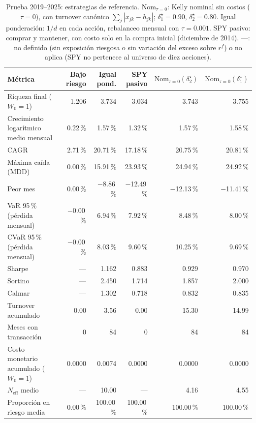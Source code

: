 \begin{table}[h]
\centering
\footnotesize
\setlength{\tabcolsep}{4pt}
\caption{Prueba 2019--2025: estrategias de referencia. $\mathrm{Nom}_{\tau=0}$: Kelly nominal sin costos ($\tau=0$), con turnover canónico $\sum_j|x_{jk}-h_{jk}|$; $\delta_1^\star=0.90$, $\delta_2^\star=0.80$. Igual ponderación: $1/d$ en cada acción, rebalanceo mensual con $\tau=0.001$. SPY pasivo: comprar y mantener, con costo solo en la compra inicial (diciembre de 2014). ---: no definido (sin exposición riesgosa o sin variación del exceso sobre $r^f$) o no aplica (SPY no pertenece al universo de diez acciones).}\label{tab:r2_e}
\begin{tabular}{|l|r|r|r|r|r|}
\hline
\textbf{Métrica} & \textbf{Bajo riesgo} & \textbf{Igual pond.} & \textbf{SPY pasivo} & \textbf{$\mathrm{Nom}_{\tau=0}(\delta_2^\star)$} & \textbf{$\mathrm{Nom}_{\tau=0}(\delta_1^\star)$} \\ \hline
Riqueza final ($W_0=1$) & 1.206 & 3.734 & 3.034 & 3.743 & 3.755 \\ \hline
Crecimiento logarítmico medio mensual & 0.22\,\% & 1.57\,\% & 1.32\,\% & 1.57\,\% & 1.58\,\% \\ \hline
CAGR & 2.71\,\% & 20.71\,\% & 17.18\,\% & 20.75\,\% & 20.81\,\% \\ \hline
Máxima caída (MDD) & 0.00\,\% & 15.91\,\% & 23.93\,\% & 24.94\,\% & 24.92\,\% \\ \hline
Peor mes & 0.00\,\% & $-$8.86\,\% & $-$12.49\,\% & $-$12.13\,\% & $-$11.41\,\% \\ \hline
VaR 95\,\% (pérdida mensual) & $-$0.00\,\% & 6.94\,\% & 7.92\,\% & 8.48\,\% & 8.00\,\% \\ \hline
CVaR 95\,\% (pérdida mensual) & $-$0.00\,\% & 8.03\,\% & 9.60\,\% & 10.25\,\% & 9.69\,\% \\ \hline
Sharpe & --- & 1.162 & 0.883 & 0.929 & 0.970 \\ \hline
Sortino & --- & 2.450 & 1.714 & 1.857 & 2.000 \\ \hline
Calmar & --- & 1.302 & 0.718 & 0.832 & 0.835 \\ \hline
Turnover acumulado & 0.00 & 3.56 & 0.00 & 15.30 & 14.99 \\ \hline
Meses con transacción & 0 & 84 & 0 & 84 & 84 \\ \hline
Costo monetario acumulado ($W_0=1$) & 0.0000 & 0.0074 & 0.0000 & 0.0000 & 0.0000 \\ \hline
$N_{\mathrm{eff}}$ medio & --- & 10.00 & --- & 4.16 & 4.55 \\ \hline
Proporción en riesgo media & 0.00\,\% & 100.00\,\% & 100.00\,\% & 100.00\,\% & 100.00\,\% \\ \hline
\end{tabular}
\end{table}
